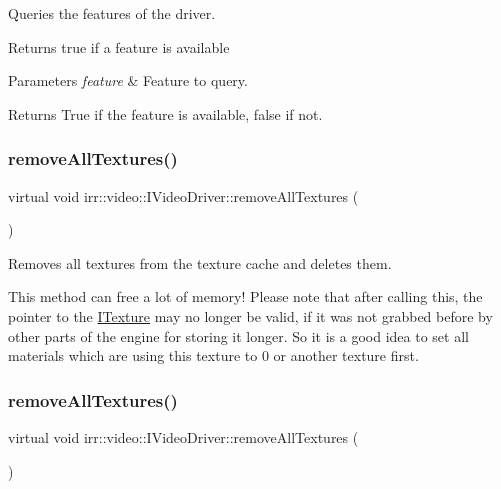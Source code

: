 Queries the features of the driver. 

Returns true if a feature is available 
\begin{DoxyParams}{Parameters}
{\em feature} & Feature to query. \\
\hline
\end{DoxyParams}
\begin{DoxyReturn}{Returns}
True if the feature is available, false if not. 
\end{DoxyReturn}
\mbox{\label{classirr_1_1video_1_1IVideoDriver_a179990e76fa91175d46c891b3508e717}} 
\subsubsection{\texorpdfstring{remove\+All\+Textures()}{removeAllTextures()}\hspace{0.1cm}{\footnotesize\ttfamily [1/2]}}
{\footnotesize\ttfamily virtual void irr\+::video\+::\+I\+Video\+Driver\+::remove\+All\+Textures (\begin{DoxyParamCaption}{ }\end{DoxyParamCaption})\hspace{0.3cm}{\ttfamily [pure virtual]}}



Removes all textures from the texture cache and deletes them. 

This method can free a lot of memory! Please note that after calling this, the pointer to the \hyperlink{classirr_1_1video_1_1ITexture}{I\+Texture} may no longer be valid, if it was not grabbed before by other parts of the engine for storing it longer. So it is a good idea to set all materials which are using this texture to 0 or another texture first. \mbox{\label{classirr_1_1video_1_1IVideoDriver_a179990e76fa91175d46c891b3508e717}} 
\subsubsection{\texorpdfstring{remove\+All\+Textures()}{removeAllTextures()}\hspace{0.1cm}{\footnotesize\ttfamily [2/2]}}
{\footnotesize\ttfamily virtual void irr\+::video\+::\+I\+Video\+Driver\+::remove\+All\+Textures (\begin{DoxyParamCaption}{ }\end{DoxyParamCaption})\hspace{0.3cm}{\ttfamily [pure virtual]}}




